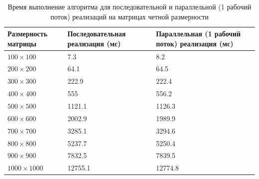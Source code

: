 \documentclass[a4paper,12pt]{article}
\begin{document}
    	\begin{table} [h!]
    	\begin{center}
    	\caption{Время выполнение алгоритма для последовательной и параллельной (1 рабочий поток) реализаций на матрицах четной размерности}
    	\begin{tabular}{|p{5cm}|p{5cm}|p{5cm}|}
    	\hline 
    	Размерность матрицы & Последовательная реализация (мс) & Параллельная (1 рабочий поток) реализация (мс) \\ 
    	\hline 
    	$100 \times 100$ & 7.3 & 8.2 \\ 
    	\hline 
    	$200 \times 200$ & 64.1 & 64.5 \\ 
    	\hline 
    	$300 \times 300$ & 222.9 & 222.4 \\ 
    	\hline 
    	$400 \times 400$ & 555 & 556.2 \\ 
    	\hline 
    	$500 \times 500$ & 1121.1 & 1126.3 \\ 
    	\hline 
    	$600 \times 600$ & 2002.9 & 1989.9  \\ 
    	\hline 
    	$700 \times 700$ & 3285.1 & 3294.6 \\ 
    	\hline 
    	$800 \times 800$ & 5237.7 & 5250.4 \\ 
    	\hline 
    	$900 \times 900$ & 7832.5 & 7839.5 \\ 
    	\hline 
    	$1000 \times 1000$ & 12755.1 & 12774.8 \\ 
    	\hline 
    	\end{tabular} 
    	\label{table:table01}
    	\end{center}
    	\end{table}
    	
\end{document}
